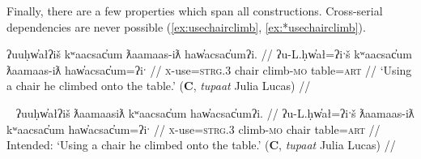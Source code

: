 {Finally, there are a few properties which span all constructions. Cross-serial dependencies are never possible (\ref{ex:usechairclimb}, \ref{ex:*usechairclimb}).

\ex \label{ex:usechairclimb}
\begingl
\glpreamble ʔuuḥw̓ałʔiš kʷaacsac̓um ƛaamaas-iƛ haw̓acsac̓umʔi. //
\gla ʔu-L.ḥw̓ał=ʔiˑš kʷaacsac̓um ƛaamaas-iƛ haw̓acsac̓um=ʔiˑ //
\glb \textsc{x}-use=\textsc{strg.3} chair climb-\textsc{mo} table=\textsc{art} //
\glft `Using a chair he climbed onto the table.' (\textbf{C}, \textit{tupaat} Julia Lucas) //
\endgl
\xe

\ex~ \label{ex:*usechairclimb}
\begingl
\glpreamble *ʔuuḥw̓ałʔiš ƛaamaasiƛ kʷaacsac̓um haw̓acsac̓umʔi. //
\gla ʔu-L.ḥw̓ał=ʔiˑš ƛaamaas-iƛ kʷaacsac̓um haw̓acsac̓um=ʔiˑ //
\glb \textsc{x}-use=\textsc{strg.3} climb-\textsc{mo} chair table=\textsc{art} //
\glft Intended: `Using a chair he climbed onto the table.' (\textbf{C}, \textit{tupaat} Julia Lucas) //
\endgl
\xe






\begin{comment}
Something similar happened with Sophie Billy. Sentence () is from a translation text she has been working on, and I asked about rephrases () and (). While I was interpreting () as manner and action (Type I), I think she, in the context of the story, saw them as sequential (Type V): lead and then bring back. In this context, the reordering of () is nonsense: One cannot bring someone back and then lead them.

\ex \label{ex:leadbringback}
\begingl
\glpreamble m̓aw̓aaƛint ḥaaw̓iłƛisi huʔacap̓ƛ. //
\gla m̓aw̓aa=!aƛ=int ḥaaw̓iłƛ=ʔis=ʔiˑ huʔa-ci-!ap=!aƛ //
\glb lead=\textsc{now}=\textsc{pst} young.man=\textsc{dimin}=\textsc{art} back-go=\textsc{caus}\textsc{now} //
\glft `She led the young man and took him back.' (\textbf{Q}, Sophie Billy) //
\endgl
\xe

NB: This is due to obj-verb ordering of ex. 3
BM
yaacukw̓it̓asaḥ waałak c̓uumaʕas
*yaacukw̓it̓asaḥ c̓uumaʕas
*yaacukw̓it̓asaḥ c̓uumaʕas waałak



\end{comment}}
